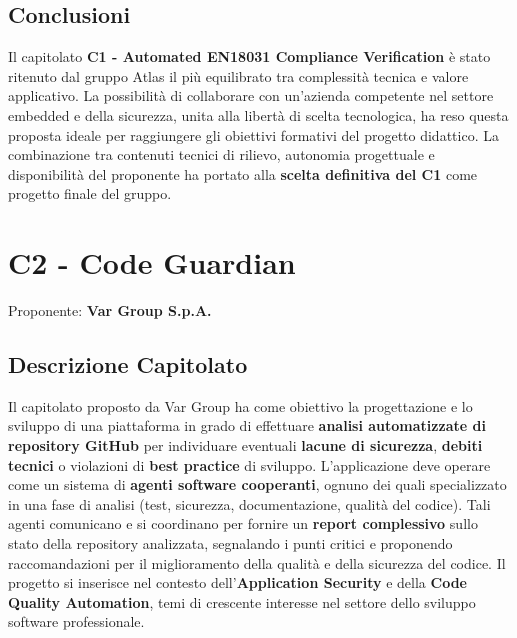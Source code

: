 \documentclass[a4paper,12pt]{article}
\begin{document}
{    \subsection{Conclusioni}
        Il capitolato \textbf{C1 - Automated EN18031 Compliance Verification} è stato ritenuto dal gruppo Atlas il più equilibrato tra complessità tecnica e valore applicativo. 
        La possibilità di collaborare con un’azienda competente nel settore embedded e della sicurezza, unita alla libertà di scelta tecnologica, ha reso questa proposta ideale per raggiungere gli obiettivi formativi del progetto didattico.
        La combinazione tra contenuti tecnici di rilievo, autonomia progettuale e disponibilità del proponente ha portato alla \textbf{scelta definitiva del C1} come progetto finale del gruppo.
    


\newpage

\section{C2 - Code Guardian}
    Proponente: \textbf{Var Group S.p.A.}

    \subsection{Descrizione Capitolato}{
        Il capitolato proposto da Var Group ha come obiettivo la progettazione e lo sviluppo di una piattaforma in grado di effettuare \textbf{analisi automatizzate di repository GitHub} per individuare eventuali \textbf{lacune di sicurezza}, \textbf{debiti tecnici} o violazioni di \textbf{best practice} di sviluppo.
        L’applicazione deve operare come un sistema di \textbf{agenti software cooperanti}, ognuno dei quali specializzato in una fase di analisi (test, sicurezza, documentazione, qualità del codice).
        Tali agenti comunicano e si coordinano per fornire un \textbf{report complessivo} sullo stato della repository analizzata, segnalando i punti critici e proponendo raccomandazioni per il miglioramento della qualità e della sicurezza del codice.
        Il progetto si inserisce nel contesto dell’\textbf{Application Security} e della \textbf{Code Quality Automation}, temi di crescente interesse nel settore dello sviluppo software professionale.
    

}}
\end{document}
